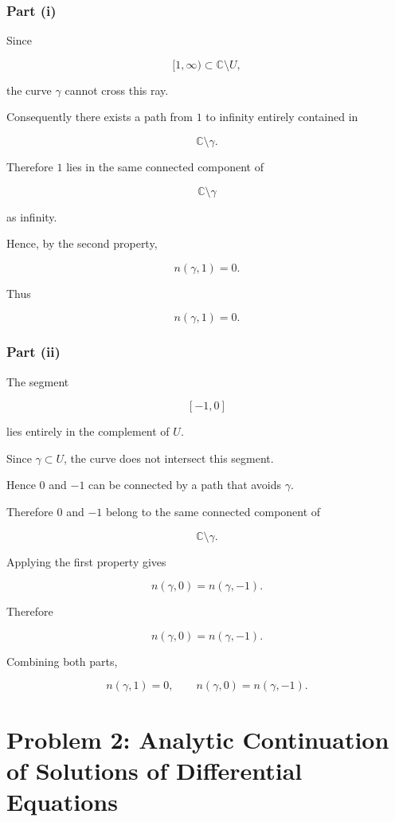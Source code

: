 \documentclass[12pt,a4paper]{article}
\theoremstyle{notespace}
\begin{document}
\subsubsection*{Part (i)}

Since

\[
[1,\infty)\subset \mathbb C\setminus U,
\]

the curve \(\gamma\) cannot cross this ray.

Consequently there exists a path from \(1\) to infinity entirely contained in

\[
\mathbb C\setminus\gamma.
\]

Therefore \(1\) lies in the same connected component of

\[
\mathbb C\setminus\gamma
\]

as infinity.

Hence, by the second property,

\[
n(\gamma,1)=0.
\]

Thus

\[
\boxed{n(\gamma,1)=0.}
\]

\subsubsection*{Part (ii)}

The segment

\[
[-1,0]
\]

lies entirely in the complement of \(U\).

Since \(\gamma\subset U\), the curve does not intersect this segment.

Hence \(0\) and \(-1\) can be connected by a path that avoids \(\gamma\).

Therefore \(0\) and \(-1\) belong to the same connected component of

\[
\mathbb C\setminus\gamma.
\]

Applying the first property gives

\[
n(\gamma,0)=n(\gamma,-1).
\]

Therefore

\[
\boxed{n(\gamma,0)=n(\gamma,-1).}
\]

Combining both parts,

\[
\boxed{
	n(\gamma,1)=0,
	\qquad
	n(\gamma,0)=n(\gamma,-1).
}
\]

\bigskip

\section{Problem 2: Analytic Continuation of Solutions of Differential Equations}
\end{document}
